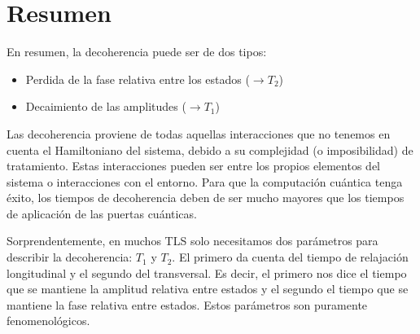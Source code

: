 \section{Resumen}

    En resumen, la decoherencia puede ser de dos tipos:
    \begin{itemize}
        \item Perdida de la fase relativa entre los estados ($\rightarrow T_2$)
        \item Decaimiento de las amplitudes ($\rightarrow T_1$)
    \end{itemize}
    Las decoherencia proviene de todas aquellas interacciones que no tenemos en cuenta el Hamiltoniano del sistema, debido a su complejidad (o imposibilidad) de tratamiento. Estas interacciones pueden ser entre los propios elementos del sistema o interacciones con el entorno. Para que la computación cuántica tenga éxito, los tiempos de decoherencia deben de ser mucho mayores que los tiempos de aplicación de las puertas cuánticas. 
    
    Sorprendentemente, en muchos TLS solo necesitamos dos parámetros para describir la decoherencia: $T_1$ y $T_2$. El primero da cuenta del tiempo de relajación longitudinal y el segundo del transversal. Es decir, el primero nos dice el tiempo que se mantiene la amplitud relativa entre estados y el segundo el tiempo que se mantiene la fase relativa entre estados. Estos parámetros son puramente fenomenológicos.
    






\nocite{*}
















